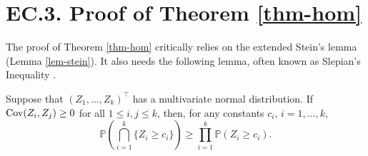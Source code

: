 \documentclass[ijoc,nonblindrev]{informs3}
\def\Cov{{\rm Cov}}
\def\pr{\mathbb{P}}
\begin{document}
\hypertarget{EC.3}{
\section*{EC.3. \hspace{5pt} Proof of Theorem \ref{thm-hom}}
}

The proof of Theorem \ref{thm-hom} critically relies on the extended Stein's lemma (Lemma \ref{lem-stein}).
It also needs the following lemma, often known as Slepian's Inequality \citep{slepian1962_ec}.

\begin{lemma}\label{lem-slepian}
Suppose that $(Z_1,\ldots,Z_k)^\intercal$ has a multivariate normal distribution. If $\Cov(Z_i, Z_j)\geq 0$ for all $1\leq i,j\leq k$, then, for any  constants $c_i$, $i=1,\ldots,k$,
\[\pr\left(\bigcap_{i=1}^k\{Z_i\geq c_i\}\right)\geq \prod_{i=1}^k \pr (Z_i\geq c_i).\]
\end{lemma}
\end{document}
